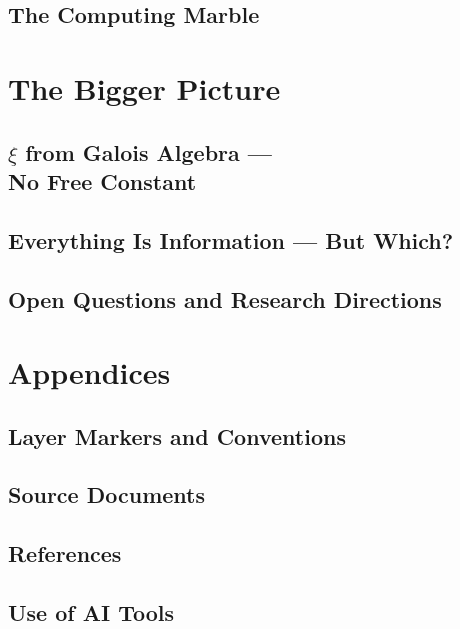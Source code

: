 \documentclass[11pt,twoside,openright]{book}
\theoremstyle{plain}
\theoremstyle{definition}
\begin{document}
\chapter{The Computing Marble}


\part{The Bigger Picture}

\chapter[xi from Galois Algebra]{$\xi$ from Galois Algebra ---\\
No Free Constant}


\chapter[Everything Is Information]{Everything Is Information --- But Which?}


\chapter{Open Questions and Research Directions}


\backmatter

\appendix
\part*{Appendices}

\chapter{Layer Markers and Conventions}


\chapter{Source Documents}


\chapter{References}


\chapter{Use of AI Tools}

\end{document}
